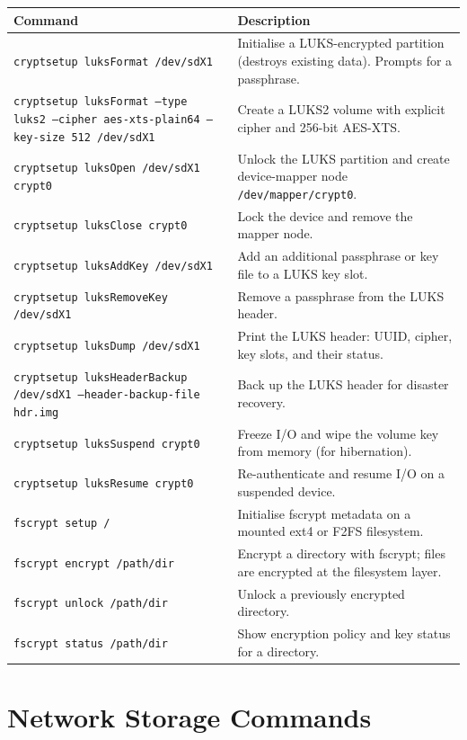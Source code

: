 \begin{longtable}{p{4cm} p{8cm}}
\toprule
\textbf{Command} & \textbf{Description} \\
\midrule
\endhead
\texttt{cryptsetup luksFormat /dev/sdX1} & Initialise a LUKS-encrypted partition (destroys existing data). Prompts for a passphrase. \\
\texttt{cryptsetup luksFormat --type luks2 --cipher aes-xts-plain64 --key-size 512 /dev/sdX1} & Create a LUKS2 volume with explicit cipher and 256-bit AES-XTS. \\
\texttt{cryptsetup luksOpen /dev/sdX1 crypt0} & Unlock the LUKS partition and create device-mapper node \texttt{/dev/mapper/crypt0}. \\
\texttt{cryptsetup luksClose crypt0} & Lock the device and remove the mapper node. \\
\texttt{cryptsetup luksAddKey /dev/sdX1} & Add an additional passphrase or key file to a LUKS key slot. \\
\texttt{cryptsetup luksRemoveKey /dev/sdX1} & Remove a passphrase from the LUKS header. \\
\texttt{cryptsetup luksDump /dev/sdX1} & Print the LUKS header: UUID, cipher, key slots, and their status. \\
\texttt{cryptsetup luksHeaderBackup /dev/sdX1 --header-backup-file hdr.img} & Back up the LUKS header for disaster recovery. \\
\texttt{cryptsetup luksSuspend crypt0} & Freeze I/O and wipe the volume key from memory (for hibernation). \\
\texttt{cryptsetup luksResume crypt0} & Re-authenticate and resume I/O on a suspended device. \\
\texttt{fscrypt setup /} & Initialise fscrypt metadata on a mounted ext4 or F2FS filesystem. \\
\texttt{fscrypt encrypt /path/dir} & Encrypt a directory with fscrypt; files are encrypted at the filesystem layer. \\
\texttt{fscrypt unlock /path/dir} & Unlock a previously encrypted directory. \\
\texttt{fscrypt status /path/dir} & Show encryption policy and key status for a directory. \\
\bottomrule
\end{longtable}

\section*{Network Storage Commands}

